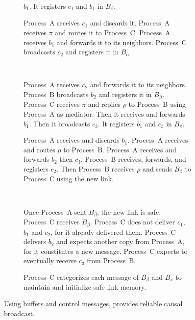 \begin{figure}
\begin{center}
\begin{subfigure}[t]{0.48\textwidth}
{        $b_1$. It registers $c_1$ and $b_1$ in $B_\beta$.}
    \end{subfigure}    
    \begin{subfigure}[t]{0.48\textwidth}
      \centering%
      \caption{\label{fig:solveF}Process~A receives $c_1$ and discards it.
        Process~A receives $\pi$ and routes it to Process~C. Process~A receives
        $b_1$ and forwards it to its neighbors. Process~C broadcasts $c_2$ and
        registers it in $B_\alpha$}
    \end{subfigure}
    ~
    \begin{subfigure}[t]{0.48\textwidth}
      \centering%
      \caption{\label{fig:solveG}Process~A receives $c_2$ and forwards it to
        its neighbors.  Process~B broadcasts $b_2$ and registers it in
        $B_\beta$. Process~C receives $\pi$ and replies $\rho$ to Process~B
        using Process~A as mediator. Then it receives and forwards $b_1$. Then
        it broadcasts $c_3$. It registers $b_1$ and $c_3$ in $B_\pi$.}
    \end{subfigure}
    \begin{subfigure}[t]{0.48\textwidth}
      \centering%
      \caption{\label{fig:solveH}Process~A receives and discards $b_1$.
        Process~A receives and routes $\rho$ to Process~B.  Process~A receives
        and forwards $b_2$ then $c_3$. Process~B receives, forwards, and
        registers $c_2$. Then Process~B receives $\rho$ and sends $B_\beta$ to
        Process~C using the new link.}
    \end{subfigure}
    ~
    \begin{subfigure}[t]{0.48\textwidth}
      \centering%
      \caption{\label{fig:solveI}Once Process~A sent $B_\beta$, the new link is
        safe.  Process~C receives $B_\beta$. Process~C does not deliver $c_1$, $b_1$
        and $c_2$, for it already delivered them. Process~C delivers $b_2$ and
        expects another copy from Process~A, for it constitutes a new message.
        Process~C expects to eventually receive $c_3$ from Process~B.}
    \end{subfigure}
    \begin{subfigure}[t]{0.99\textwidth}
      \centering%
      \caption{\label{fig:solveJ}Process~C categorizes each message of $B_\beta$
        and $B_\pi$ to maintain and initialize safe link memory.}
    \end{subfigure}
    \caption{\label{fig:solve}Using buffers and control messages, \RPCBROADCAST 
      provides reliable causal broadcast.}
  \end{center}
\end{figure}

